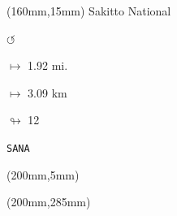 \begin{textblock*}{40mm}(160mm,15mm)%
Sakitto National
\par \Huge$\circlearrowleft$
\Large
\par$\mapsto$ 1.92 mi.
\par$\mapsto$ 3.09 km
\par$\looparrowright$ 12
\par\hfill\tiny\tt SANA\\
\end{textblock*}
\begin{textblock*}{20mm}(200mm,5mm)%
\fbox{\thepage}
\end{textblock*}
\begin{textblock*}{20mm}(200mm,285mm)%
\fbox{\thepage}
\end{textblock*}
\null\newpage

